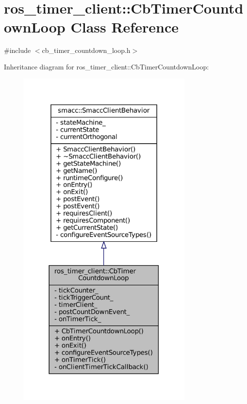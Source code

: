 \hypertarget{classros__timer__client_1_1CbTimerCountdownLoop}{}\section{ros\+\_\+timer\+\_\+client\+:\+:Cb\+Timer\+Countdown\+Loop Class Reference}
\label{classros__timer__client_1_1CbTimerCountdownLoop}


{\ttfamily \#include $<$cb\+\_\+timer\+\_\+countdown\+\_\+loop.\+h$>$}



Inheritance diagram for ros\+\_\+timer\+\_\+client\+:\+:Cb\+Timer\+Countdown\+Loop\+:
\nopagebreak
\begin{figure}[H]
\begin{center}
\leavevmode
\includegraphics[width=249pt]{classros__timer__client_1_1CbTimerCountdownLoop__inherit__graph}
\end{center}
\end{figure}



